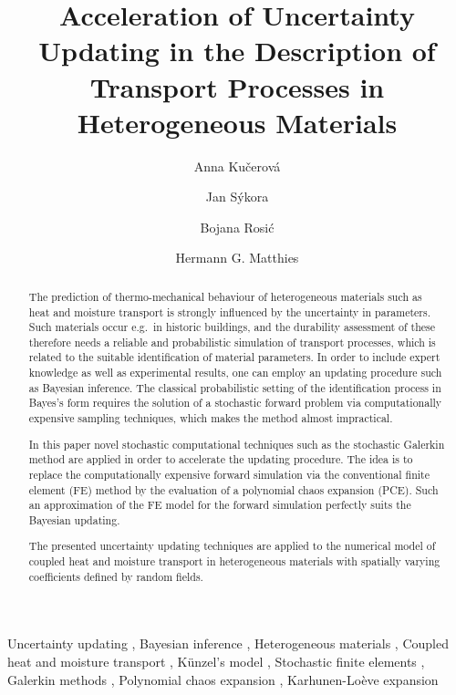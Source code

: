 \documentclass[preprint,12pt]{elsarticle}
\begin{document}
\begin{frontmatter}

\title{Acceleration of Uncertainty Updating in the Description of Transport Processes
in Heterogeneous Materials}

\author[ctu]{Anna Ku\v{c}erov\'a}
\author[ctu]{Jan S\'{y}kora}
\author[tubs]{Bojana Rosi\'c}
\author[tubs]{Hermann G. Matthies}
\address[ctu]{Department of Mechanics, Faculty of Civil Engineering,
  Czech Technical University in Prague, Th\'{a}kurova 7, 166 29 Prague
  6, Czech Republic}
\address[tubs]{Institute of Scientific Computing, Technische Universit\"at
Braunschweig, Hans-Sommer-Str. 65, 38092 Braunschweig, Germany}


\begin{abstract}
  The prediction of thermo-mechanical behaviour of heterogeneous
  materials such as heat and moisture transport is strongly influenced
  by the uncertainty in parameters. Such materials occur e.g.\ in
  historic buildings, and the durability assessment of these therefore
  needs a reliable and probabilistic simulation of transport
  processes, which is related to the suitable identification of
  material parameters.  In order to include expert knowledge as
  well as experimental results, one can employ an updating procedure
  such as Bayesian inference. The classical probabilistic setting of
  the identification process in Bayes's form requires the solution of a
  stochastic forward problem via computationally expensive sampling
  techniques, which makes the method almost impractical.

  In this paper novel stochastic computational techniques such as the
  stochastic Galerkin method are applied in order to accelerate the
  updating procedure. The idea is to replace the computationally
  expensive forward simulation via the conventional finite element
  (FE) method by the evaluation of a polynomial chaos expansion
  (PCE). Such an approximation of the FE model for the forward
  simulation perfectly suits the Bayesian updating.

  The presented uncertainty updating techniques are applied to the
  numerical model of coupled heat and moisture transport in
  heterogeneous materials with spatially varying coefficients defined
  by random fields.
\end{abstract}

\begin{keyword}
Uncertainty updating \sep
Bayesian inference \sep
Heterogeneous materials \sep
Coupled heat and moisture transport \sep
K\"unzel's model \sep
Stochastic finite elements \sep
Galerkin methods \sep
Polynomial chaos expansion \sep
Karhunen-Lo\`eve expansion
\end{keyword}

\end{frontmatter}
\end{document}
